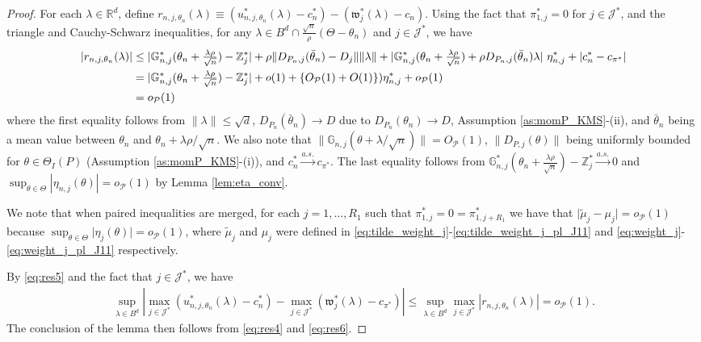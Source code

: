 \documentclass[letterpaper,11pt]{article}
\theoremstyle{myplain}
\theoremstyle{mydefinition}
\theoremstyle{myremark}
\newcommand{\G}{\mathbb{G}}
\newcommand{\HH}{\mathbb{Z}}
\newcommand{\cJ}{\mathcal{J}}
\newcommand{\cP}{\mathcal{P}}
\newcommand{\larhon}{\frac{\lambda \rho }{\sqrt n}}
\newcommand{\tlarhon}{\tfrac{\lambda \rho }{\sqrt n}}
\numberwithin{equation}{section}
\numberwithin{figure}{section}
\begin{document}
\begin{appendices}
\begin{proof}
For each $\lambda\in\mathbb R^d$, define $r_{n,j,\theta_{n}}(\lambda)\equiv (u^*_{n,j,\theta_{n}}(\lambda)-c^{*}_{n})-(\mathfrak{w}_{j}^*(\lambda)-c_{n})$.
Using 
the fact that $\pi_{1,j}^*=0$ for $j \in \cJ^*$, and the triangle and Cauchy-Schwarz inequalities, for any $\lambda\in B^d\cap \frac{\sqrt{n}}{\rho }(\Theta-\theta_{n})$ and $j \in \cJ^*$, we have
\begin{align}
 |r_{n,j,\theta_{n}}(\lambda)|
 &\le |\mathbb G^*_{n,j}(\theta_{n}+\tlarhon)-\HH^*_j| +\rho \|D_{P_{n},j}(\bar\theta_{n})-D_j\|\|\lambda\|+|\mathbb G^*_{n,j}(\theta_{n}+\tlarhon)+ \rho  D_{P_{n},j}(\bar\theta_{n})\lambda|~\eta_{n,j}^* +|c^{*}_{n}-c_{\pi^*}|\notag\\
&= |\mathbb G^*_{n,j}(\theta_{n}+\tlarhon)-\HH^*_j|+o(1)+\{O_{\mathcal P}(1)+O(1)\})\eta_{n,j}^*+o_{\cP}(1)\notag\\
&=o_{\cP}(1)\label{eq:res5}
\end{align}
where the first equality follows from $\|\lambda\|\le\sqrt d$, $D_{P_n}(\bar\theta_n)\to D$ due to $D_{P_n}(\theta_n)\to D$, Assumption \ref{as:momP_KMS}-(ii), and $\bar\theta_{n}$ being a mean value between $\theta_{n}$ and $\theta_{n}+\lambda \rho /\sqrt{n}$. We also note that $\|\G_{n,j}(\theta+\lambda/\sqrt n)\|=O_{\cP}(1)$, $\|D_{P,j}(\theta)\|$ being uniformly bounded for $\theta\in\Theta_I(P)$ (Assumption \ref{as:momP_KMS}-(i)), and $c^*_n\stackrel{a.s.}{\to}c_{\pi^*}.$
The last equality follows from $\mathbb G^*_{n,j}(\theta_{n}+\larhon)-\HH^*_j\stackrel{a.s.}{\to}0$ and $\sup_{\theta\in\Theta}|\eta_{n,j}(\theta)|=o_{\mathcal P}(1)$ by Lemma \ref{lem:eta_conv}.


We note that when paired inequalities are merged, for each $j=1,\dots,R_1$ such that $\pi^*_{1,j}=0=\pi^*_{1,j+R_1}$ we have that $\vert \tilde{\mu}_j -\mu_j \vert = o_\cP(1)$ because $\sup_{\theta \in \Theta}\vert\eta_j(\theta)\vert=o_\cP(1)$, where $\tilde{\mu}_j $ and $\mu_j$ were defined in \eqref{eq:tilde_weight_j}-\eqref{eq:tilde_weight_j_pl_J11} and \eqref{eq:weight_j}-\eqref{eq:weight_j_pl_J11} respectively.


By \eqref{eq:res5} and the fact that $j \in \cJ^*$, we have
\begin{align}
	\sup_{\lambda\in  B^d }|\max_{j\in\mathcal J^*}(u^*_{n,j,\theta_{n}}(\lambda)-c^{*}_{n})-\max_{j\in\mathcal J^*}(\mathfrak{w}_{j}^*(\lambda)-c_{\pi^*})|
	\le \sup_{\lambda\in  B^d }\max_{j\in\mathcal J^*}|r_{n,j,\theta_{n}}(\lambda)|=o_{\mathcal P}(1).\label{eq:res6}
\end{align}
The conclusion of the lemma then follows from \eqref{eq:res4} and \eqref{eq:res6}.


\end{proof}
\end{appendices}
\end{document}
